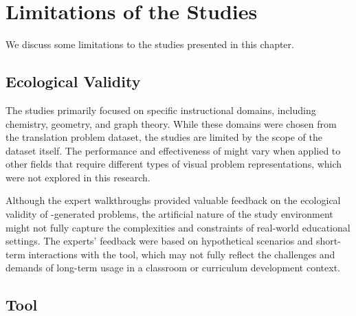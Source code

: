 


\section{Limitations of the Studies}

We discuss some limitations to the studies presented in this chapter. 


\subsection{Ecological Validity}

The studies primarily focused on specific instructional domains, including chemistry, geometry, and graph theory. While these domains were chosen from the translation problem dataset, the studies are limited by the scope of the dataset itself. The performance and effectiveness of \Edgeworth might vary when applied to other fields that require different types of visual problem representations, which were not explored in this research.

Although the expert walkthroughs provided valuable feedback on the ecological validity of \Edgeworth-generated problems, the artificial nature of the study environment might not fully capture the complexities and constraints of real-world educational settings. The experts' feedback were based on hypothetical scenarios and short-term interactions with the tool, which may not fully reflect the challenges and demands of long-term usage in a classroom or curriculum development context.

\subsection{Tool}
\label{sec:edgeworth-limitations}


